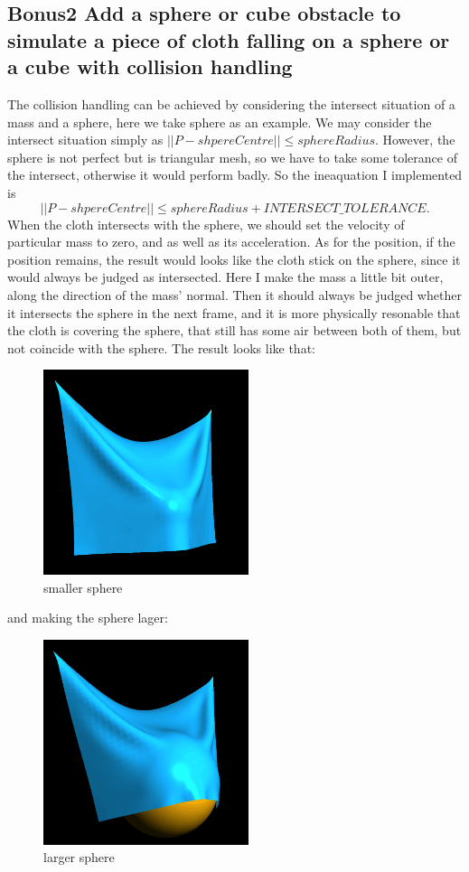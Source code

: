 \documentclass[acmtog]{acmart}
\begin{document}
\subsection{Bonus2 Add a sphere or cube obstacle to simulate a piece of cloth falling on a sphere or a cube with collision handling}
The collision handling can be achieved by considering the intersect situation of a mass and a sphere, here we take sphere as an example. We may consider the intersect situation simply as $||P-shpereCentre||\leq sphereRadius$. However, the sphere is not perfect but is triangular mesh, so we have to take some tolerance of the intersect, otherwise it would perform badly. So the ineaquation I implemented is $$||P-shpereCentre||\leq sphereRadius+INTERSECT\_TOLERANCE.$$
When the cloth intersects with the sphere, we should set the velocity of particular mass to zero, and as well as its acceleration. As for the position, if the position remains, the result would looks like the cloth stick on the sphere, since it would always be judged as intersected. Here I make the mass a little bit outer, along the direction of the mass' normal. Then it should always be judged whether it intersects the sphere in the next frame, and it is more physically resonable that the cloth is covering the sphere, that still has some air between both of them, but not coincide with the sphere.
The result looks like that:
\begin{figure}[h]
	\includegraphics[width=6cm,height=6cm]{sphereObstacle1.png}
	\caption{smaller sphere}
\end{figure}
and making the sphere lager:
\begin{figure}[h]
	\includegraphics[width=6cm,height=6cm]{sphereObstacle2.png}
	\caption{larger sphere}
\end{figure}
\end{document}

